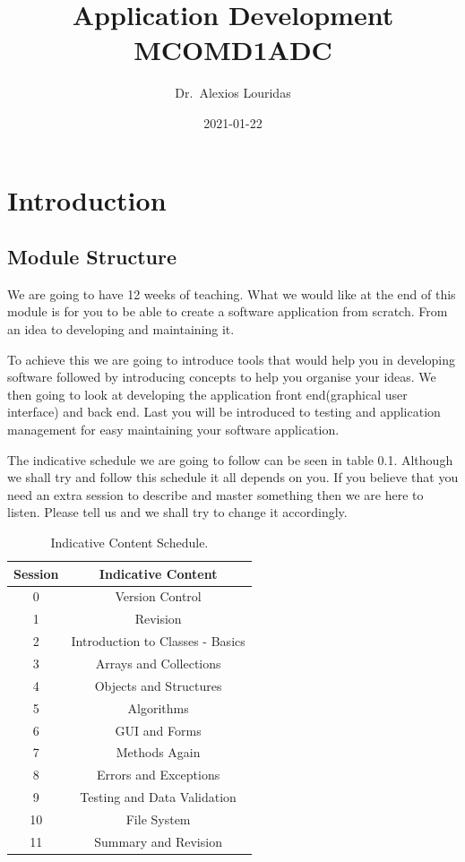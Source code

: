 \documentclass[
]{book}
\title{Application Development MCOMD1ADC}
\author{Dr.~Alexios Louridas}
\date{2021-01-22}
\theoremstyle{definition}
\theoremstyle{definition}
\theoremstyle{definition}
\theoremstyle{remark}
\begin{document}
\maketitle

{
\setcounter{tocdepth}{1}
\tableofcontents
}
\hypertarget{introduction}{%
\chapter*{Introduction}\label{introduction}}

\hypertarget{module-structure}{%
\section*{Module Structure}\label{module-structure}}

We are going to have 12 weeks of teaching. What we would like at the end of this module is for you to be able to create a software application from scratch. From an idea to developing and maintaining it.

To achieve this we are going to introduce tools that would help you in developing software followed by introducing concepts to help you organise your ideas. We then going to look at developing the application front end(graphical user interface) and back end. Last you will be introduced to testing and application management for easy maintaining your software application.

The indicative schedule we are going to follow can be seen in table 0.1. Although we shall try and follow this schedule it all depends on you. If you believe that you need an extra session to describe and master something then we are here to listen. Please tell us and we shall try to change it accordingly.

\begin{table}

\caption{\label{tab:unnamed-chunk-1}Indicative Content Schedule.}
\centering
\begin{tabular}[t]{c|c}
\hline
Session & Indicative Content\\
\hline
0 & Version Control\\
\hline
1 & Revision\\
\hline
2 & Introduction to Classes - Basics\\
\hline
3 & Arrays and Collections\\
\hline
4 & Objects and Structures\\
\hline
5 & Algorithms\\
\hline
6 & GUI and Forms\\
\hline
7 & Methods Again\\
\hline
8 & Errors and Exceptions\\
\hline
9 & Testing and Data Validation\\
\hline
10 & File System\\
\hline
11 & Summary and Revision\\
\hline
\end{tabular}
\end{table}
\end{document}
